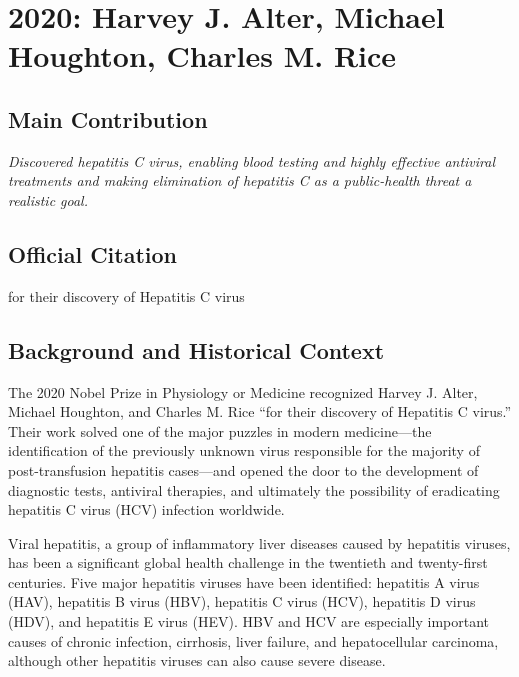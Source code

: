 \chapter[2020 --- Alter et al.]{2020: Harvey J. Alter, Michael Houghton, Charles M. Rice}
\label{ch:2020_Alter}

\section*{Main Contribution}

\textit{Discovered hepatitis C virus, enabling blood testing and highly effective antiviral treatments and making elimination of hepatitis C as a public-health threat a realistic goal.}\cite{nobel-2020,lecture-2020}

\section{Official Citation}

for their discovery of Hepatitis C virus

\section{Background and Historical Context}

The 2020 Nobel Prize in Physiology or Medicine recognized Harvey J. Alter, Michael Houghton, and Charles M. Rice ``for their discovery of Hepatitis C virus.'' Their work solved one of the major puzzles in modern medicine---the identification of the previously unknown virus responsible for the majority of post-transfusion hepatitis cases---and opened the door to the development of diagnostic tests, antiviral therapies, and ultimately the possibility of eradicating hepatitis C virus (HCV) infection worldwide.

Viral hepatitis, a group of inflammatory liver diseases caused by hepatitis viruses, has been a significant global health challenge in the twentieth and twenty-first centuries. Five major hepatitis viruses have been identified: hepatitis A virus (HAV), hepatitis B virus (HBV), hepatitis C virus (HCV), hepatitis D virus (HDV), and hepatitis E virus (HEV). HBV and HCV are especially important causes of chronic infection, cirrhosis, liver failure, and hepatocellular carcinoma, although other hepatitis viruses can also cause severe disease.

